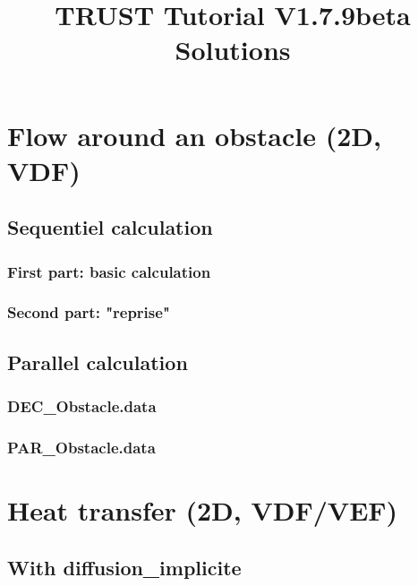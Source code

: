 \documentclass[english]{article}
\begin{document}
\title{TRUST Tutorial V1.7.9beta Solutions}
\maketitle
\tableofcontents{}
\newpage

\section{Flow around an obstacle (2D, VDF)}
\subsection{Sequentiel calculation}
\subsubsection{First part: basic calculation}

\subsubsection{Second part: "reprise"}


\subsection{Parallel calculation}
\subsubsection{DEC\_Obstacle.data}

\subsubsection{PAR\_Obstacle.data}



\section{Heat transfer (2D, VDF/VEF)}
\subsection{With diffusion\_implicite}

\end{document}
